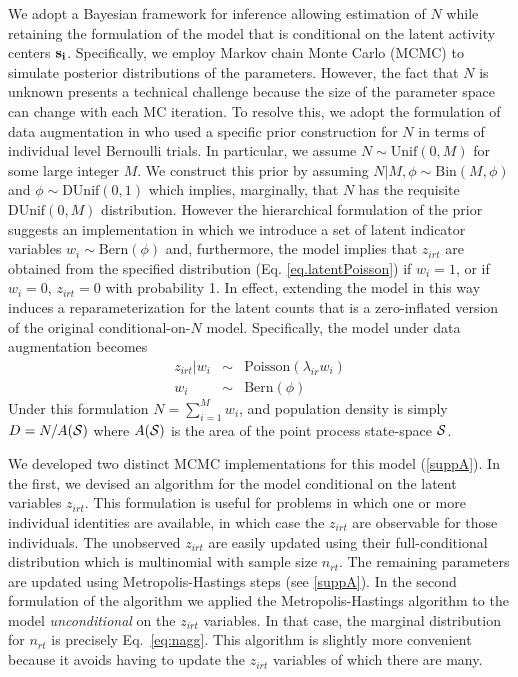 We adopt a Bayesian framework for inference allowing estimation of $N$
while retaining the formulation of the model that is conditional on
the latent activity centers $\bf s_i$.
Specifically, we employ Markov chain Monte Carlo
(MCMC) to simulate posterior distributions of the parameters. However,
the fact that $N$ is unknown presents a
technical challenge because the size of the parameter space can change
with each MC iteration. To resolve this, we
adopt the formulation of data augmentation in \citet{royle_etal:2007} who
used a specific prior construction for $N$ in terms of individual level
Bernoulli trials. In particular, we assume $N \sim \mbox{Unif}(0,M)$
for some large integer $M$. We construct this prior by assuming
$N|M,\phi \sim \mbox{Bin}(M,\phi)$ and $\phi \sim \mbox{DUnif}(0,1)$
which implies, marginally, that $N$ has the requisite
$\mbox{DUnif}(0,M)$ distribution. However
the hierarchical formulation of the prior suggests an implementation
in which we introduce a set of latent indicator variables $w_{i} \sim
\mbox{Bern}(\phi)$ and, furthermore, the model implies
that $z_{irt}$ are obtained
from the specified distribution (Eq. \ref{eq.latentPoisson})
if $w_{i} = 1$, or if
$w_{i}=0$, %
$z_{irt} =0$ with probability 1. In
effect, extending the model in this way induces a reparameterization
for the latent counts %
that is a zero-inflated version
of the original conditional-on-$N$ model. Specifically, the model
under
data augmentation becomes
\begin{eqnarray*}
 z_{irt}|w_{i} &\sim & \mbox{Poisson}(\lambda_{ir} w_i) \\
 w_{i} & \sim & \mbox{Bern}(\phi)
\end{eqnarray*}
Under this formulation $N = \sum_{i=1}^{M} w_i$, and population
density is simply $D = N/A({\cal S})$ where $A({\cal S})$ is the area of the
point process state-space ${\cal S}$.

We developed two distinct MCMC implementations for this model (\ref{suppA}). In the
first, we devised an algorithm for the model conditional on the latent
variables $z_{irt}$. This formulation is useful for problems in which
one or more individual identities are available, in which case the
$z_{irt}$ are observable for those individuals. The unobserved
$z_{irt}$ are easily updated using their full-conditional
distribution which is multinomial with sample size $n_{rt}$. The
remaining parameters are updated using Metropolis-Hastings steps (see
\ref{suppA}).  In the second formulation of the algorithm we applied
the Metropolis-Hastings algorithm to the model {\it unconditional} on
the $z_{irt}$ variables. In that case, the marginal distribution for
$n_{rt}$ is precisely Eq.~\ref{eq:nagg}.  This algorithm is slightly more
convenient because
it avoids having to update the $z_{irt}$ variables of which there are many.




